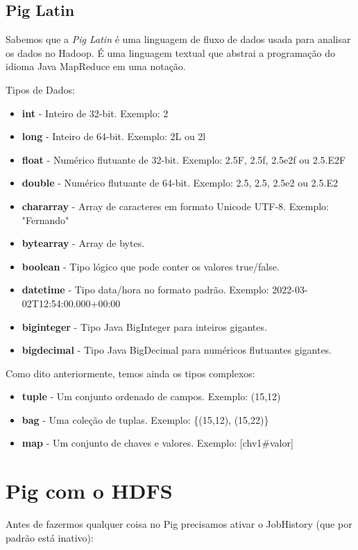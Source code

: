 \documentclass[a4paper,11pt]{article}
\begin{document}
\subsection{Pig Latin}
Sabemos que a \textit{Pig Latin} é uma linguagem de fluxo de dados usada para analisar os dados no Hadoop. É uma linguagem textual que abstrai a programação do idioma Java MapReduce em uma notação.

Tipos de Dados: \vspace{-1em}
\begin{itemize}
	\item \textbf{int} - Inteiro de 32-bit. Exemplo: 2
	\item \textbf{long} - Inteiro de 64-bit. Exemplo: 2L ou 2l
	\item \textbf{float} - Numérico flutuante de 32-bit. Exemplo: 2.5F, 2.5f, 2.5e2f ou 2.5.E2F
	\item \textbf{double} - Numérico flutuante de 64-bit. Exemplo: 2.5, 2.5, 2.5e2 ou 2.5.E2
	\item \textbf{chararray} - Array de caracteres em formato Unicode UTF-8. Exemplo: "Fernando"
	\item \textbf{bytearray} - Array de bytes.
	\item \textbf{boolean} - Tipo lógico que pode conter os valores true/false.
	\item \textbf{datetime} - Tipo data/hora no formato padrão. Exemplo: 2022-03-02T12:54:00.000+00:00
	\item \textbf{biginteger} - Tipo Java BigInteger para inteiros gigantes.
	\item \textbf{bigdecimal} - Tipo Java BigDecimal para numéricos flutuantes gigantes.
\end{itemize}

Como dito anteriormente, temos ainda os tipos complexos: \vspace{-1em}
\begin{itemize}
	\item \textbf{tuple} - Um conjunto ordenado de campos. Exemplo: (15,12)
	\item \textbf{bag} - Uma coleção de tuplas. Exemplo: \{(15,12), (15,22)\}
	\item \textbf{map} - Um conjunto de chaves e valores. Exemplo: [chv1\#valor]
\end{itemize}

\section{Pig com o HDFS}
Antes de fazermos qualquer coisa no Pig precisamos ativar o JobHistory (que por padrão está inativo):
\end{document}
